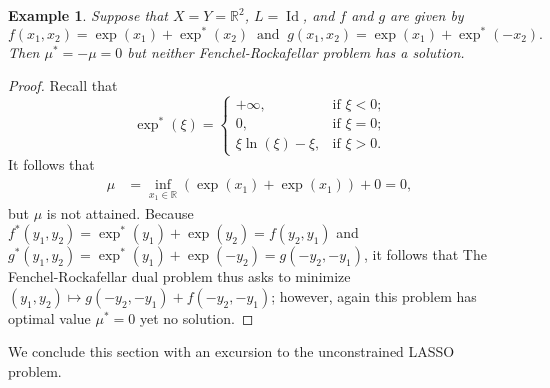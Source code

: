\documentclass{article}
\newcommand{\RR}{\ensuremath{\mathbb R}}
\newcommand{\Id}{\ensuremath{\operatorname{Id}}}
\newcommand{\pinf}{\ensuremath{+\infty}}
\newtheorem{example}[theorem]{Example}
\begin{document}
\begin{example}
Suppose that $X=Y=\RR^2$, $L=\Id$, and $f$ and $g$ are given by 
\begin{equation}
f(x_1,x_2) = \exp(x_1)+\exp^*(x_2)
\;\;\text{and}\;\;
g(x_1,x_2) = \exp(x_1)+\exp^*(-x_2).
\end{equation}
Then $\mu^* = -\mu = 0$ but neither Fenchel-Rockafellar problem has 
a solution.
\end{example}
\begin{proof}
Recall that 
\begin{equation}
\exp^*(\xi) = 
\begin{cases}
\pinf, &\text{if $\xi<0$;}\\
0, &\text{if $\xi=0$;}\\
\xi\ln(\xi)-\xi, &\text{if $\xi>0$.}
\end{cases}
\end{equation}
It follows that
\begin{align}
\mu &= 
\inf_{x_1\in\RR}(\exp(x_1)+\exp(x_1)) + 0 = 0,
\end{align}
but $\mu$ is not attained. 
Because $f^*(y_1,y_2)= \exp^*(y_1)+\exp(y_2) = f(y_2,y_1)$ and 
$g^*(y_1,y_2) = \exp^*(y_1)+\exp(-y_2) = g(-y_2,-y_1)$, 
it follows that 
The Fenchel-Rockafellar dual problem thus asks to minimize 
$(y_1,y_2)\mapsto g(-y_2,-y_1)+f(-y_2,-y_1)$; however,
again this problem has optimal value $\mu^*=0$ yet no solution. 
\end{proof}

We conclude this section with an excursion to the 
unconstrained LASSO problem. 
\end{document}
